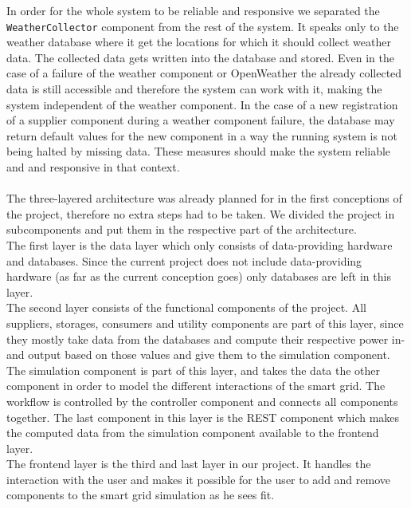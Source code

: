 In order for the whole system to be reliable and responsive we separated the \texttt{WeatherCollector} component from the rest of the system.
It speaks only to the weather database where it get the locations for which it should collect weather data.
The collected data gets written into the database and stored.
Even in the case of a failure of the weather component or OpenWeather the already collected data is still accessible and therefore the system can work with it, making the system independent of the weather component.
In the case of a new registration of a supplier component during a weather component failure, the database may return default values for the new component in a way the running system is not being halted by missing data.
These measures should make the system reliable and and responsive in that context.\\
\\
The three-layered architecture was already planned for in the first conceptions of the project, therefore no extra steps had to be taken.
We divided the project in subcomponents and put them in the respective part of the architecture.\\
The first layer is the data layer which only consists of data-providing hardware and databases. 
Since the current project does not include data-providing hardware (as far as the current conception goes) only databases are left in this layer.\\
The second layer consists of the functional components of the project.
All suppliers, storages, consumers and utility components are part of this layer, since they mostly take data from the databases and compute their respective power in- and output based on those values and give them to the simulation component.
The simulation component is part of this layer, and takes the data the other component in order to model the different interactions of the smart grid.
The workflow is controlled by the controller component and connects all components together.
The last component in this layer is the REST component which makes the computed data from the simulation component available to the frontend layer.\\
The frontend layer is the third and last layer in our project.
It handles the interaction with the user and makes it possible for the user to add and remove components to the smart grid simulation as he sees fit.